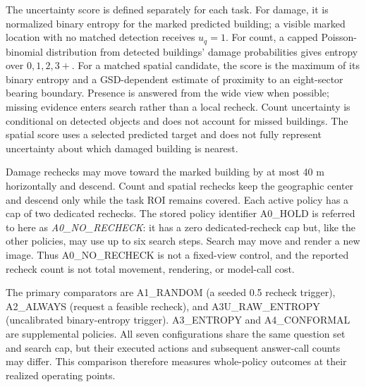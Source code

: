The uncertainty score is defined separately for each task. For damage, it is normalized binary entropy for the marked predicted building; a visible marked location with no matched detection receives $u_q=1$. For count, a capped Poisson-binomial distribution from detected buildings' damage probabilities gives entropy over $0,1,2,3+$. For a matched spatial candidate, the score is the maximum of its binary entropy and a GSD-dependent estimate of proximity to an eight-sector bearing boundary. Presence is answered from the wide view when possible; missing evidence enters search rather than a local recheck. Count uncertainty is conditional on detected objects and does not account for missed buildings. The spatial score uses a selected predicted target and does not fully represent uncertainty about which damaged building is nearest.

Damage rechecks may move toward the marked building by at most 40 m horizontally and descend. Count and spatial rechecks keep the geographic center and descend only while the task ROI remains covered. Each active policy has a cap of two dedicated rechecks. The stored policy identifier A0\_HOLD is referred to here as \emph{A0\_NO\_RECHECK}: it has a zero dedicated-recheck cap but, like the other policies, may use up to six search steps. Search may move and render a new image. Thus A0\_NO\_RECHECK is not a fixed-view control, and the reported recheck count is not total movement, rendering, or model-call cost.

The primary comparators are A1\_RANDOM (a seeded 0.5 recheck trigger), A2\_ALWAYS (request a feasible recheck), and A3U\_RAW\_ENTROPY (uncalibrated binary-entropy trigger). A3\_ENTROPY and A4\_CONFORMAL are supplemental policies. All seven configurations share the same question set and search cap, but their executed actions and subsequent answer-call counts may differ. This comparison therefore measures whole-policy outcomes at their realized operating points.
